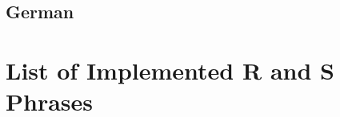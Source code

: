 \documentclass[a4paper,notitlepage]{scrreprt}
\begin{document}
\subsection{German}
\bigskip
{}
\allhpstatements
{}


\section{List of Implemented R and S Phrases}

\newenvironment{RandS}{\bigskip\bgroup\footnotesize\noindent}{\par\egroup}
\newcommand{\rs}[2][]{\textbf{\rsnumber[#1]{#2}}: \rsphrase{}}
\newcommand{\rsskip}{\par\medskip}
\newcommand{\allrsphrases}[1][]{
  \par
  \begin{RandS}
    \rs{R1}
    \rs{R2}
    \rs{R3}
    \rs{R4}
    \rs{R5}
    \rs{R6}
    \rs{R7}
    \rs{R8}
    \rs{R9}
    \rs{R10}
    \rs{R11}
    \rs{R12}
    \rs{R14}
    \rs{R15}
    \rs{R16}
    \rs{R17}
    \rs{R18}
    \rs{R19}
    \rs{R20}
    \rs{R21}
    \rs{R22}
    \rs{R23}
    \rs{R24}
    \rs{R25}
    \rs{R26}
    \rs{R27}
    \rs{R28}
    \rs{R29}
    \rs{R30}
    \rs{R31}
    \rs{R32}
    \rs{R33}
    \rs{R34}
    \rs{R35}
    \rs{R36}
    \rs{R37}
    \rs{R38}
    \rs{R39}
    \rs{R40}
    \rs{R41}
    \rs{R42}
    \rs{R43}
    \rs{R44}
    \rs{R45}
    \rs{R46}
    \rs{R48}
    \rs{R49}
    \rs{R50}
    \rs{R51}
    \rs{R52}
    \rs{R53}
    \rs{R54}
    \rs{R55}
    \rs{R56}
    \rs{R57}
    \rs{R58}
    \rs{R59}
    \rs{R60}
    \rs{R61}
    \rs{R62}
    \rs{R63}
    \rs{R64}
    \rs{R65}
    \rs{R66}
    \rs{R67}
    \rs{R68}
    \rs{R14/15}
    \rs{R15/29}
    \rs{R20/21}
    \rs{R20/22}
    \rs{R20/21/22}
    \rs{R21/22}
    \rs{R23/24}
    \rs{R23/25}
    \rs{R23/24/25}
    \rs{R24/25}  
    \rs{R26/27}
    \rs{R26/28}
    \rs{R26/27/28}
    \rs{R27/28}
    \rs{R36/37}
    \rs{R36/38}
    \rs{R36/37/38}
    \rs{R37/38}
    \rs{R39/23}
    \rs{R39/24}
    \rs{R39/25}
    \rs{R39/23/24}
    \rs{R39/23/25}
    \rs{R39/24/25}
    \rs{R39/23/24/25}
    \rs{R39/26}
    \rs{R39/27}
    \rs{R39/28}
    \rs{R39/26/27}
    \rs{R39/26/28}
    \rs{R39/27/28}
    \rs{R39/26/27/28}
    \rs{R42/43}
    \rs{R48/20}
    \rs{R48/21}
    \rs{R48/22}
    \rs{R48/20/21}
    \rs{R48/20/22}
    \rs{R48/21/22}
    \rs{R48/20/21/22}
    \rs{R48/23}
    \rs{R48/24}
    \rs{R48/25}
    \rs{R48/23/24}
    \rs{R48/23/25}
    \rs{R48/24/25}
    \rs{R48/23/24/25}

\end{RandS}}
\end{document}
